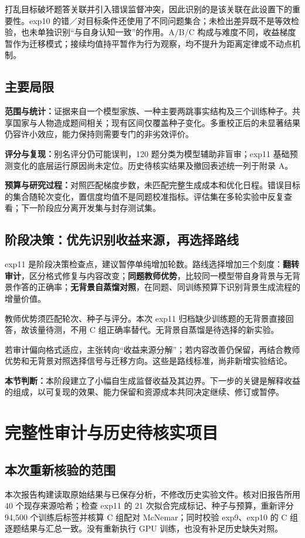 \documentclass[11pt,a4paper]{article}
\newcommand{\takeaway}[1]{\par\noindent\colorbox{light}{\parbox{\dimexpr\linewidth-2\fboxsep\relax}{\small\textbf{本节判断：}#1}}\par}
\begin{document}
打乱目标破坏题答关联并引入错误监督冲突，因此识别的是该关联在此设置下的重要性。exp10 的错／对目标条件还使用了不同问题集合；未检出差异既不是等效检验，也未单独识别“与自身认知一致”的作用。A/B/C 构成与难度不同，收益梯度暂作为迁移模式；接续均值持平暂作为行为观察，均不提升为距离定律或不动点机制。
\subsection{主要局限}
\textbf{范围与统计：}证据来自一个模型家族、一种主要两跳事实结构及三个训练种子。共享国家与人物造成题间相关；现有区间仅覆盖种子变化。多重校正后的未显著结果仍容许小效应，能力保持则需要专门的非劣效评价。

\textbf{评分与复现：}别名评分仍可能误判，120 题分类为模型辅助非盲审；exp11 基础预测变化的底层运行原因尚未定位。历史待核实结果及撤回表述统一列于附录 A。

\textbf{预算与研究过程：}对照匹配梯度步数，未匹配完整生成成本和优化日程。错误目标的集合随轮次变化，置信度均值不是同题校准指标。评估集在多轮实验中反复查看；下一阶段应分离开发集与封存测试集。
\subsection{阶段决策：优先识别收益来源，再选择路线}
exp11 是阶段决策检查点，建议暂停单纯增加轮数。路线选择增加三个刻度：\textbf{翻转审计}，区分格式修复与内容改变；\textbf{同题教师优势}，比较同一模型带自身背景与无背景作答的正确率；\textbf{无背景自蒸馏对照}，在同题、同训练预算下识别背景生成流程的增量价值。

教师优势须匹配轮次、种子与评分。本次 exp11 归档缺少训练题的无背景直接回答，故该量待测，不用 C 组正确率替代。无背景自蒸馏是待选择的新实验。

若审计偏向格式适应，主张转向“收益来源分解”；若内容改善仍保留，再结合教师优势和无背景对照选择信号与迁移方向。这些是路线标准，尚非新增实验结论。
\takeaway{本阶段建立了小幅自生成监督收益及其边界。下一步的关键是解释收益的组成，以可复现的效果、能力保留和资源成本共同决定继续、修订或暂停。}
\clearpage
\appendix
\section{完整性审计与历史待核实项目}
\subsection{本次重新核验的范围}
本次报告构建读取原始结果与已保存分析，不修改历史实验文件。核对旧报告所用 40 个现存来源哈希；检查 exp11 的 21 次拟合完成标记、种子与预算，重新评分 94,500 个训练后标签并核算 C 组配对 McNemar；同时校验 exp9、exp10 的 C 组逐题结果与汇总一致。没有重新执行 GPU 训练，也没有补足历史缺失对照。
\end{document}
